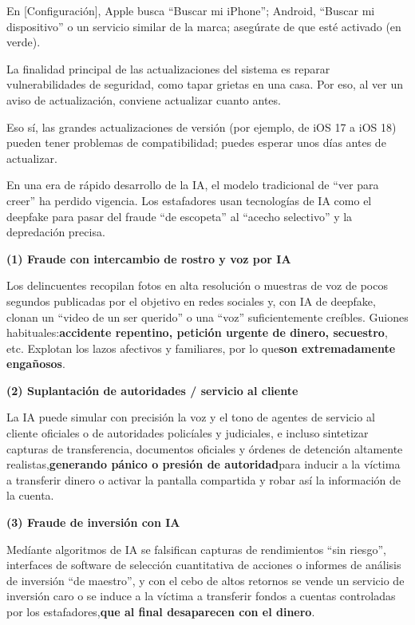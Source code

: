 En [Configuración], Apple busca “Buscar mi iPhone”; Android, “Buscar mi dispositivo” o un servicio similar de la marca; asegúrate de que esté activado (en verde).


La finalidad principal de las actualizaciones del sistema es reparar vulnerabilidades de seguridad, como tapar grietas en una casa. Por eso, al ver un aviso de actualización, conviene actualizar cuanto antes.

Eso sí, las grandes actualizaciones de versión (por ejemplo, de iOS 17 a iOS 18) pueden tener problemas de compatibilidad; puedes esperar unos días antes de actualizar.


En una era de rápido desarrollo de la IA, el modelo tradicional de “ver para creer” ha perdido vigencia. Los estafadores usan tecnologías de IA como el deepfake para pasar del fraude “de escopeta” al “acecho selectivo” y la depredación precisa.


\textbf{(1) Fraude con intercambio de rostro y voz por IA}\par

Los delincuentes recopilan fotos en alta resolución o muestras de voz de pocos segundos publicadas por el objetivo en redes sociales y, con IA de deepfake, clonan un “video de un ser querido” o una “voz” suficientemente creíbles. Guiones habituales:\textbf{accidente repentino, petición urgente de dinero, secuestro}, etc. Explotan los lazos afectivos y familiares, por lo que\textbf{son extremadamente engañosos}.

\textbf{(2) Suplantación de autoridades / servicio al cliente}\par

La IA puede simular con precisión la voz y el tono de agentes de servicio al cliente oficiales o de autoridades policíales y judiciales, e incluso sintetizar capturas de transferencia, documentos oficiales y órdenes de detención altamente realistas,\textbf{generando pánico o presión de autoridad}para inducir a la víctima a transferir dinero o activar la pantalla compartida y robar así la información de la cuenta.

\textbf{(3) Fraude de inversión con IA}\par

Medíante algoritmos de IA se falsifican capturas de rendimientos “sin riesgo”, interfaces de software de selección cuantitativa de acciones o informes de análisis de inversión “de maestro”, y con el cebo de altos retornos se vende un servicio de inversión caro o se induce a la víctima a transferir fondos a cuentas controladas por los estafadores,\textbf{que al final desaparecen con el dinero}.

